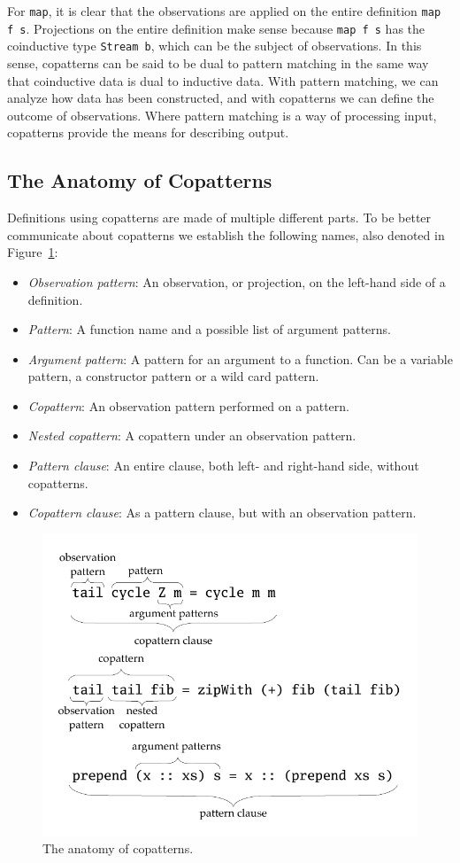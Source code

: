 For \texttt{map}, it is clear that the observations are applied on the entire
definition \texttt{map f s}. Projections on the entire definition make sense
because \texttt{map f s} has the coinductive type \texttt{Stream b}, which can
be the subject of observations. In this sense, copatterns can be said to be dual
to pattern matching in the same way that coinductive data is dual to inductive
data. With pattern matching, we can analyze how data has been constructed, and
with copatterns we can define the outcome of observations. Where pattern
matching is a way of processing input, copatterns provide the means for
describing output. 

\subsection{The Anatomy of Copatterns}
Definitions using copatterns are made of multiple different parts. To be better
communicate about copatterns we establish the following names, also denoted in
Figure~\ref{fig:copatterns_anatomy}:

\newcommand{\itemEmph}[1]{\item \emph{#1}:}

\begin{itemize}
\itemEmph{Observation pattern} An observation, or projection, on the
  left-hand side of a definition.
\itemEmph{Pattern} A function name and a possible list of argument patterns.
\itemEmph{Argument pattern} A pattern for an argument to a function. Can be a
variable pattern, a constructor pattern or a wild card pattern.
\itemEmph{Copattern} An observation pattern performed on a pattern.
\itemEmph{Nested copattern} A copattern under an observation pattern.
\itemEmph{Pattern clause} An entire clause, both left- and right-hand side,
without copatterns.
\itemEmph{Copattern clause} As a pattern clause, but with an observation pattern.
\end{itemize}

\begin{figure}[H]
\centering
  \includegraphics[scale=1]{figures/copattern_anatomy}
  \caption{The anatomy of copatterns.}
  \label{fig:copatterns_anatomy}
\end{figure}

